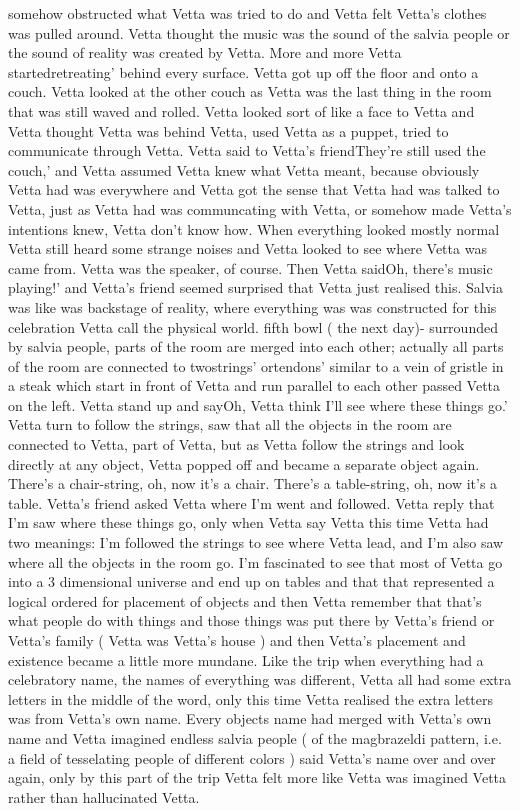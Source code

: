 \documentclass[12pt]{book}
\begin{document}
somehow obstructed what Vetta was tried to do and Vetta felt Vetta's clothes was pulled around. Vetta thought the music was the sound of the salvia people or the sound of reality was created by Vetta. More and more Vetta startedretreating' behind every surface. Vetta got up off the floor and onto a couch. Vetta looked at the other couch as Vetta was the last thing in the room that was still waved and rolled. Vetta looked sort of like a face to Vetta and Vetta thought Vetta was behind Vetta, used Vetta as a puppet, tried to communicate through Vetta. Vetta said to Vetta's friendThey're still used the couch,' and Vetta assumed Vetta knew what Vetta meant, because obviously Vetta had was everywhere and Vetta got the sense that Vetta had was talked to Vetta, just as Vetta had was communcating with Vetta, or somehow made Vetta's intentions knew, Vetta don't know how. When everything looked mostly normal Vetta still heard some strange noises and Vetta looked to see where Vetta was came from. Vetta was the speaker, of course. Then Vetta saidOh, there's music playing!' and Vetta's friend seemed surprised that Vetta just realised this. Salvia was like was backstage of reality, where everything was was constructed for this celebration Vetta call the physical world. fifth bowl ( the next day)- surrounded by salvia people, parts of the room are merged into each other; actually all parts of the room are connected to twostrings' ortendons' similar to a vein of gristle in a steak which start in front of Vetta and run parallel to each other passed Vetta on the left. Vetta stand up and sayOh, Vetta think I'll see where these things go.' Vetta turn to follow the strings, saw that all the objects in the room are connected to Vetta, part of Vetta, but as Vetta follow the strings and look directly at any object, Vetta popped off and became a separate object again. There's a chair-string, oh, now it's a chair. There's a table-string, oh, now it's a table. Vetta's friend asked Vetta where I'm went and followed. Vetta reply that I'm saw where these things go, only when Vetta say Vetta this time Vetta had two meanings: I'm followed the strings to see where Vetta lead, and I'm also saw where all the objects in the room go. I'm fascinated to see that most of Vetta go into a 3 dimensional universe and end up on tables and that that represented a logical ordered for placement of objects and then Vetta remember that that's what people do with things and those things was put there by Vetta's friend or Vetta's family ( Vetta was Vetta's house ) and then Vetta's placement and existence became a little more mundane. Like the trip when everything had a celebratory name, the names of everything was different, Vetta all had some extra letters in the middle of the word, only this time Vetta realised the extra letters was from Vetta's own name. Every objects name had merged with Vetta's own name and Vetta imagined endless salvia people ( of the magbrazeldi pattern, i.e. a field of tesselating people of different colors ) said Vetta's name over and over again, only by this part of the trip Vetta felt more like Vetta was imagined Vetta rather than hallucinated Vetta.
\end{document}
